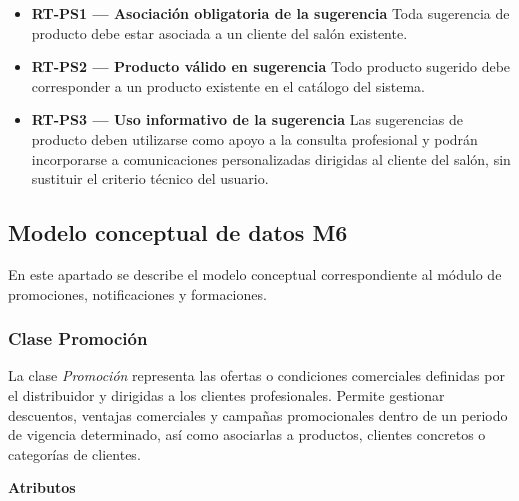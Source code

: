 \begin{itemize}

      \item \textbf{RT-PS1 — Asociación obligatoria de la sugerencia}
            Toda sugerencia de producto debe estar asociada a un cliente del salón existente.
      \item \textbf{RT-PS2 — Producto válido en sugerencia}
            Todo producto sugerido debe corresponder a un producto existente en el catálogo del sistema.
      \item \textbf{RT-PS3 — Uso informativo de la sugerencia}
            Las sugerencias de producto deben utilizarse como apoyo a la consulta profesional y podrán incorporarse a comunicaciones personalizadas dirigidas al cliente del salón, sin sustituir el criterio técnico del usuario.
\end{itemize}

\subsection{Modelo conceptual de datos M6}

En este apartado se describe el modelo conceptual correspondiente al módulo de promociones, notificaciones y formaciones.


\subsubsection{Clase Promoción}

La clase \textit{Promoción} representa las ofertas o condiciones comerciales definidas por el distribuidor y dirigidas a los clientes profesionales. Permite gestionar descuentos, ventajas comerciales y campañas promocionales dentro de un periodo de vigencia determinado, así como asociarlas a productos, clientes concretos o categorías de clientes.

\textbf{Atributos}

